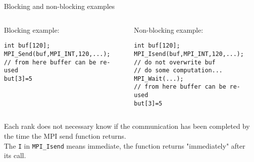 \documentclass[aspectratio=43]{beamer}
\begin{document}
\begin{frame}[fragile]{Blocking and non-blocking examples}
    \begin{columns}
        \begin{column}{0.4\paperwidth}
            Blocking example:
            \footnotesize
            \begin{verbatim}
int buf[120];
MPI_Send(buf,MPI_INT,120,...);
// from here buffer can be re-used
but[3]=5



            \end{verbatim}
        \end{column}
        \begin{column}{0.4\paperwidth}
            Non-blocking example:
            \footnotesize
            \begin{verbatim}
int buf[120];
MPI_Isend(buf,MPI_INT,120,...);
// do not overwrite buf
// do some computation...
MPI_Wait(...);
// from here buffer can be re-used
but[3]=5
            \end{verbatim}
        \end{column}
    \end{columns}
Each rank does not necessary know if the communication has been completed by the time the MPI send function returns.\\
The {\color{cscsred}\verb+I+} in \verb+MPI_+{\color{cscsred}\verb+I+}\verb+send+ means {\color{cscsred}immediate}, the function returns "immediately" after its call.
\end{frame}
\end{document}
